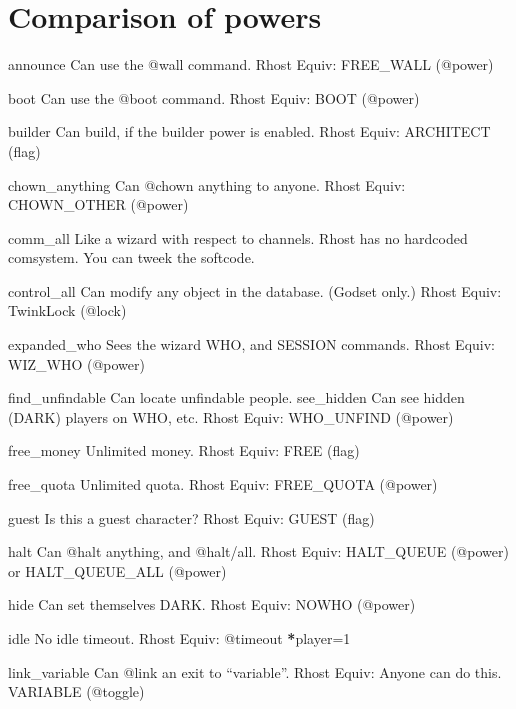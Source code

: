 \documentclass[letterpaper,10pt,english]{sphinxmanual}
\begin{document}
\chapter{Comparison of powers}
\label{\detokenize{powers:comparison-of-powers}}\label{\detokenize{powers::doc}}
\sphinxAtStartPar
announce              Can use the @wall command.
Rhost Equiv: \sphinxhyphen{} FREE\_WALL (@power)

\sphinxAtStartPar
boot                  Can use the @boot command.
Rhost Equiv: BOOT (@power)

\sphinxAtStartPar
builder               Can build, if the builder power is enabled.
Rhost Equiv: ARCHITECT (flag)

\sphinxAtStartPar
chown\_anything        Can @chown anything to anyone.
Rhost Equiv: CHOWN\_OTHER (@power)

\sphinxAtStartPar
comm\_all              Like a wizard with respect to channels.
Rhost has no hardcoded comsystem.  You can tweek the softcode.

\sphinxAtStartPar
control\_all           Can modify any object in the database. (God\sphinxhyphen{}set only.)
Rhost Equiv: TwinkLock (@lock)

\sphinxAtStartPar
expanded\_who          Sees the wizard WHO, and SESSION commands.
Rhost Equiv: WIZ\_WHO (@power)

\sphinxAtStartPar
find\_unfindable       Can locate unfindable people.
see\_hidden            Can see hidden (DARK) players on WHO, etc.
Rhost Equiv: WHO\_UNFIND (@power)

\sphinxAtStartPar
free\_money            Unlimited money.
Rhost Equiv: FREE (flag)

\sphinxAtStartPar
free\_quota            Unlimited quota.
Rhost Equiv: FREE\_QUOTA (@power)

\sphinxAtStartPar
guest                 Is this a guest character?
Rhost Equiv: GUEST (flag)

\sphinxAtStartPar
halt                  Can @halt anything, and @halt/all.
Rhost Equiv: HALT\_QUEUE (@power) or HALT\_QUEUE\_ALL (@power)

\sphinxAtStartPar
hide                  Can set themselves DARK.
Rhost Equiv: NOWHO (@power)

\sphinxAtStartPar
idle                  No idle timeout.
Rhost Equiv: @timeout {\color{red}\bfseries{}*}player=\sphinxhyphen{}1

\sphinxAtStartPar
link\_variable         Can @link an exit to “variable”.
Rhost Equiv: Anyone can do this.  VARIABLE (@toggle)
\end{document}
